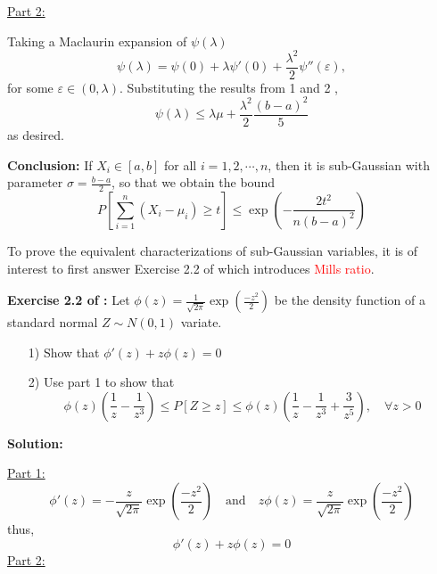 \documentclass[10pt,handout,english]{beamer}
\newcommand{\1}{\mathbbm{1}}
\begin{document}
\begin{frame}[allowframebreaks]
\underline{Part 2:}

Taking a Maclaurin expansion of $\psi(\lambda)$
\[
\psi(\lambda)=\psi(0)+\lambda\psi'(0)+\frac{\lambda^2}{2}\psi''(\varepsilon),
\]
for some $\varepsilon\in(0,\lambda)$. Substituting the results from 1 and 2 ,
\[
\psi(\lambda)\leq\lambda\mu+\frac{\lambda^2}{2}\frac{(b-a)^2}{5}
\]
as desired.

\textbf{Conclusion:} If $X_i\in [a,b]$ for all $i=1,2,\cdots,n$, then it is sub-Gaussian with parameter $\sigma=\frac{b-a}{2}$, so that we obtain the bound
\[
P\left[\sum\limits_{i=1}^n(X_i-\mu_i)\geq t\right]\leq\exp\left(-\frac{2t^2}{n(b-a)^2}\right)
\]
\end{frame}
\begin{frame}[allowframebreaks]
To prove the equivalent characterizations of sub-Gaussian variables, it is of interest to first answer Exercise 2.2 of \citet{wainwright2019high} which introduces \textcolor{red}{Mills ratio}.

\textbf{Exercise 2.2 of \citet{wainwright2019high}:} Let $\phi(z)=\frac{1}{\sqrt{2\pi}}\exp\left(\frac{-z^2}{2}\right)$ be the density function of a standard normal $Z\sim N(0,1)$ variate.
\begin{itemize}
\item[1)]Show that $\phi'(z)+z\phi(z)=0$
\item[2)] Use part 1 to show that
\[
\phi(z)\left(\frac{1}{z}-\frac{1}{z^3}\right)\leq P[Z\geq z]\leq\phi(z)\left(\frac{1}{z}-\frac{1}{z^3}+\frac{3}{z^5}\right),\quad \forall z>0
\]
\end{itemize}
\textbf{Solution:}

\underline{Part 1:}
\[
\phi'(z)=-\frac{z}{\sqrt{2\pi}}\exp\left(\frac{-z^2}{2}\right)\quad \text{and}\quad z\phi(z)=\frac{z}{\sqrt{2\pi}}\exp\left(\frac{-z^2}{2}\right) 
\]
thus,
\[
\phi'(z)+z\phi(z)=0
\]
\underline{Part 2:} 


\end{frame}
\end{document}
